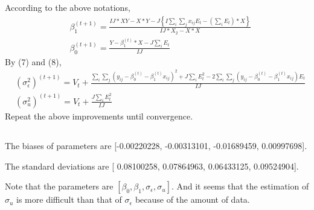 \documentclass{article}
\begin{document}
		According to the above notations, 
		\begin{align*}
			&\beta_1^{(t+1)} = \frac{IJ*XY - X*Y - J\left\{ I\sum_i \sum_j x_{ij}E_t - (\sum_i E_t)*X \right\}}{IJ*X_2 - X*X}\\[10pt]
			&\beta_0^{(t+1)} = \frac{Y - \beta_1^{(t)}*X - J \sum_i E_t}{IJ}
		\end{align*}
		By (7) and (8), 
		\begin{align*}
			&(\sigma_\epsilon^2)^{(t+1)} = V_t + \frac{\sum_i \sum_j (y_{ij} - \beta_0^{(t)} - \beta_1^{(t)}x_{ij})^2 + J \sum_i E_t^2 - 2\sum_i \sum_j (y_{ij} - \beta_0^{(t)} - \beta_1^{(t)}x_{ij})E_t}{IJ}\\[10pt]
			&(\sigma_u^2)^{(t+1)} = V_t + \frac{J\sum_i E_t^2}{IJ}
		\end{align*}
		Repeat the above improvements until convergence.
	\subsection{}
		
		\par
		The biases of parameters are [-0.00220228, -0.00313101, -0.01689459,  0.00997698].
		\par
		The standard deviations are [ 0.08100258,  0.07864963,  0.06433125,  0.09524904].
		\par
		Note that the parameters are $[\beta_0, \beta_1, \sigma_\epsilon, \sigma_u]$. And it seems that the estimation of $\sigma_u$ is more difficult than that of $\sigma_\epsilon$ because of the amount of data.
\end{document}
